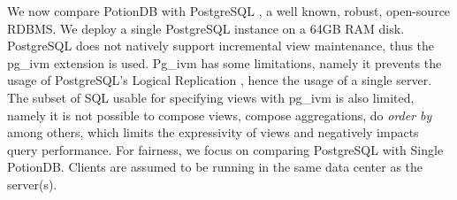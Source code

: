 \documentclass[sigplan,twocolumn,review,anonymous]{acmart}
\begin{document}

We now compare PotionDB with PostgreSQL \cite{PostgreSQL}, a well known, robust, open-source RDBMS.
We deploy a single PostgreSQL instance on a 64GB RAM disk. %
PostgreSQL does not natively support incremental view maintenance, thus the pg\_ivm extension \cite{ivm} is used.
Pg\_ivm has some limitations, namely it prevents the usage of PostgreSQL's Logical Replication \cite{ivm, PostgreSQLLogical}, hence the usage of a single server.
The subset of SQL usable for specifying views with pg\_ivm is also limited, namely it is not possible to compose views, compose aggregations, do \emph{order by} among others, which limits the expressivity of views and negatively impacts query performance. %
For fairness, we focus on comparing PostgreSQL with Single PotionDB.
Clients are assumed to be running in the same data center as the server(s). %
\end{document}
